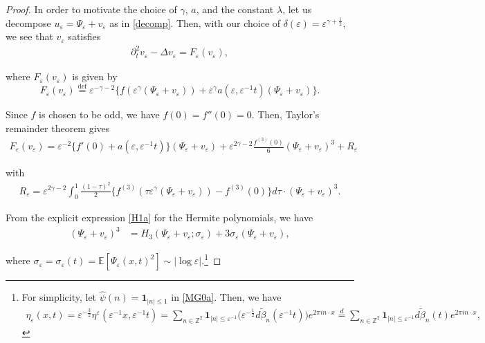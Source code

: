 \documentclass[letterpaper, 11pt,  reqno]{amsart}
\newcommand{\1}{\hspace{0.5mm}\text{I}\hspace{0.5mm}}
\newcommand{\noi}{\noindent}
\newcommand{\Z}{\mathbb{Z}}
\newcommand{\E}{\mathbb{E}}
\newcommand{\be}{\beta}
\newcommand{\dl}{\delta}
\newcommand{\Dl}{\Delta}
\newcommand{\eps}{\varepsilon}
\newcommand{\g}{\gamma}
\newcommand{\s}{\sigma}
\newcommand{\ft}{\widehat}
\newcommand{\wt}{\widetilde}
\newcommand{\dt}{\partial_t}
\newcommand{\ind}{\mathbf 1}
\numberwithin{equation}{section}
\numberwithin{theorem}{section}
\begin{document}
\begin{proof}
In order to motivate the choice of $\gamma$, $a$, and the constant $\lambda$,
let us decompose $u_{\eps} = \Psi_{\eps} +v_{\eps}$ 
as in \eqref{decomp}.
Then, with our choice of $\dl(\eps) =  \eps^{\g+ \frac{1}{2}}$, 
we see that $v_{\eps}$ satisfies 
\begin{align}
 \dt^2 v_\eps - \Dl v_\eps = F_\eps(v_\eps), 
\label{SNLW13}
 \end{align}

\noi
where $F_\eps(v_\eps)$ is given by 
\[ F_{\eps} (v_{\eps}) \overset{\text{def}}{=} \eps^{-
   \gamma - 2} \big\{f (\eps^{\gamma} (\Psi_{\eps} +
   v_{\eps})) + \eps^{\gamma} a (\eps,\eps^{-1} t) 
   (\Psi_{\eps} + v_{\eps})\big\} . \]


Since $f$ is chosen to be odd, we have $f (0) = f'' (0) = 0$.
Then, Taylor's remainder theorem gives
\begin{align}
 F_{\eps} (v_{\eps}) = \eps^{- 2} \big\{f' (0) + a  (\eps, \eps^{-1} t)\big\} (\Psi_{\eps} + v_{\eps}) 
+ \eps^{2   \g - 2}  \frac{f^{(3)} (0)}{6}  (\Psi_{\eps} +
   v_{\eps})^3 + R_{\eps} 
\label{MG1}
\end{align}

\noi
with
\begin{align}
 R_{\eps} = \eps^{2 \gamma - 2} \int_0^1 \frac{(1 -
   \tau)^2}{2}  \big\{f^{(3)} (\tau \eps^{\gamma} (\Psi_{\eps} +
   v_{\eps})) - f^{(3)} (0)\big\}d \tau \cdot (\Psi_{\eps} +
   v_{\eps})^3 . 
\label{MG2}
\end{align}


\noi
From the explicit expression \eqref{H1a} for the Hermite polynomials, 
we have
\begin{align*}
  (\Psi_{\eps} + v_{\eps})^3 
  & = H_3 (\Psi_{\eps} +  v_{\eps}; \sigma_{\eps}) + 3 \sigma_{\eps}
   (\Psi_{\eps} + v_{\eps}), 
\end{align*}

\noi
where 
 $\s_{\eps} = \s_{\eps} (t) = \E
[\Psi_{\eps} (x, t)^2] \sim | \log \eps |$.\footnote{\label{foot12}
For simplicity, let  $\ft \psi(n) = \ind_{|n| \leq 1}$ in \eqref{MG0a}.
Then,  we have
\begin{align}
\eta_{\eps} (x, t) = \eps^{- \frac 3  2} \eta^\eps (\eps^{-1} x, \eps^{- 1} t)
=   \sum_{n\in  \Z^{2}}
\ind_{|n|\leq \eps^{-1}} \big(\eps^{-\frac12}d \wt \be_n (\eps^{-1}t)\big) e^{2\pi i  n\cdot x} 
\stackrel{d}{=}   \sum_{n\in  \Z^{2}}
\ind_{|n|\leq \eps^{-1}} d \wt \be_n (t) e^{2\pi i  n\cdot x}, 
\label{MG0}
\end{align}

}
\end{proof}
\end{document}
